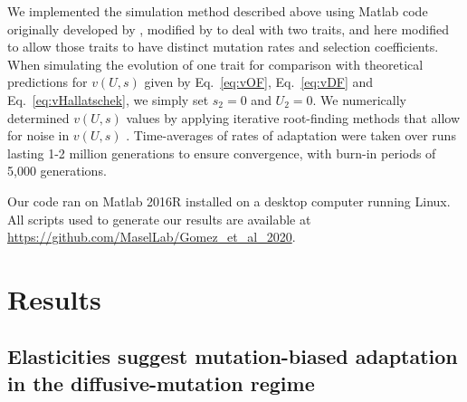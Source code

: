 \documentclass[9pt,twocolumn,twoside]{article}
\begin{document}
We implemented the simulation method described above using Matlab code originally developed by \citet{pearce2019rapid}, modified by \citet{gomez2019directional} to deal with two traits, and here modified to allow those traits to have distinct mutation rates and selection coefficients. When simulating the evolution of one trait for comparison with theoretical predictions for $v(U,s)$ given by Eq.~\eqref{eq:vOF}, Eq.~\eqref{eq:vDF} and Eq.~\eqref{eq:vHallatschek}, we simply set $s_2=0$ and $U_2=0$. We numerically determined $v(U,s)$ values by applying iterative root-finding methods that allow for noise in $v(U,s)$ \citep{kushner2003stochastic}. Time-averages of rates of adaptation were taken over runs lasting 1-2 million generations to ensure convergence, with burn-in periods of 5,000 generations.

Our code ran on Matlab 2016R installed on a desktop computer running Linux. All scripts used to generate our results are available at \url{https://github.com/MaselLab/Gomez_et_al_2020}.

\section{Results} \label{sec: results}

\subsection{Elasticities suggest mutation-biased adaptation in the diffusive-mutation regime} \label{subsec:results:1Dmutdrivadpt}
\end{document}
